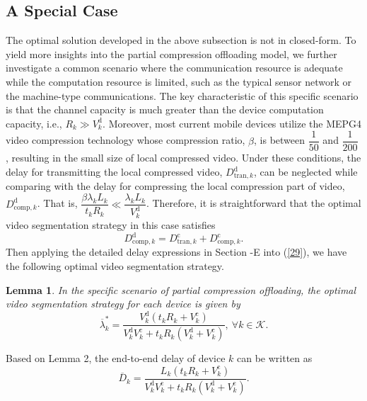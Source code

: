 \documentclass[journal,draftcls,onecolumn,12pt,twoside]{IEEEtran}
\newtheorem{lem}{Lemma}
\begin{document}
\subsection{A Special Case}
The optimal solution developed in the above subsection is not in closed-form. To yield more insights into the partial compression offloading model, we further investigate a common scenario where the communication resource is adequate while the computation resource is limited, such as the typical sensor network or the machine-type communications. The key characteristic of this specific scenario is that the channel capacity is much greater than the device computation capacity, i.e., $R_k \gg V_k^{\text{d}}$. Moreover, most current mobile devices utilize the MEPG4 video compression technology whose compression ratio, $\beta$, is between $\dfrac{1}{50}$ and $\dfrac{1}{200}$ \cite{Video_compression}, resulting in the small size of local compressed video. Under these conditions, the delay for transmitting the local compressed video, $D_{\text{tran},k}^{\text{d}}$, can be neglected while comparing with the delay for compressing the local compression part of video, $D_{\text{comp},k}^{\text{d}}$. That is, $\dfrac{\beta \lambda_k L_k}{t_k R_k} \ll \dfrac{\lambda_k L_k}{V_k^{\text{d}}}$. Therefore, it is straightforward that the optimal video segmentation strategy in this case satisfies
\begin{equation}
    D_{\text{comp},k}^{\text{d}}=D_{\text{tran},k}^{\text{c}}+D_{\text{comp},k}^{\text{c}}. \label{29}
\end{equation}
Then applying the detailed delay expressions in Section \uppercase\expandafter{}-E into (\ref{29}), we have the following optimal video segmentation strategy.
\begin{lem}
In the specific scenario of partial compression offloading, the optimal video segmentation strategy for each device is given by
\begin{equation}
	\overline{\lambda}_k^*=\frac{ V_k^{\text{d}} \left(t_kR_k+V_k^{\text{c}}\right)} { V_k^{\text{d}} V_k^{\text{c}} + t_k R_k \left(V_k^{\text{d}}+V_k^{\text{c}} \right)},~\forall k \in \mathcal{K}.\label{30}
\end{equation}
\end{lem}
Based on Lemma 2, the end-to-end delay of device $k$ can be written as
\begin{equation}
	\overline{D}_k=\frac{L_k\left(t_kR_k+V_k^{\text{c}}\right)}{V_k^{\text{d}}V_k^{\text{c}}+t_kR_k\left(V_k^{\text{d}}+V_k^{\text{c}} \right)}\label{31}.
\end{equation}
\end{document}
